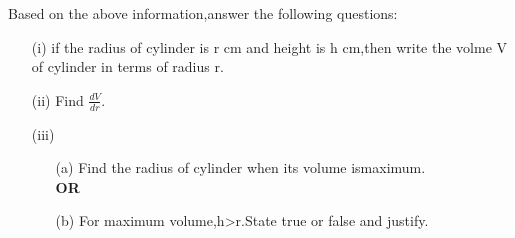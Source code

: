 \documentclass{article}
\newcommand\tab[1][1cm]{\hspace*{#1}}
\begin{document}
\begin{enumerate}
		Based on the above information,answer the following questions:\\
		
			\begin{enumerate}
				\item[(i)] if the radius of cylinder is r cm and height is h cm,then write the volme V of cylinder in terms of radius r.
					\\
				\item[(ii)] Find $ \frac {dV}{dr} $.
					\\
				\item[(iii)] \begin{enumerate}
						\item[(a)] Find the radius of cylinder when its volume ismaximum.\\
					\tab[4cm]	\textbf{OR}
			
		\item[(b)] For maximum volume,h>r.State true or false and justify.
				\end{enumerate}
			\end{enumerate}
		

\end{enumerate}
\end{document}
